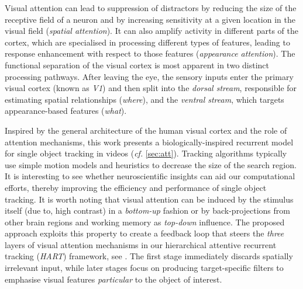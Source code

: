 	Visual attention can lead to suppression of distractors by reducing the size of the receptive field of a neuron and by increasing sensitivity at a given location in the visual field (\emph{spatial attention}). It can also amplify activity in different parts of the cortex, which are
	specialised in processing different types of features, leading to  response enhancement with respect to those features (\emph{appearance attention}).
	The functional separation of the visual cortex is most apparent in two distinct processing pathways. After leaving the eye, the sensory inputs enter the primary visual cortex (known as \emph{V1}) and then split into the \emph{dorsal stream}, responsible for estimating spatial relationships (\emph{where}), and the \emph{ventral stream}, which targets appearance-based features (\emph{what}).

    Inspired by the general architecture of the human visual cortex and the role of attention mechanisms, this work presents a biologically-inspired recurrent model for single object tracking in videos (\emph{cf.} \cref{sec:att}). Tracking algorithms typically use simple motion models and heuristics to decrease the size of the search region. It is interesting to see whether neuroscientific insights can aid our computational efforts, thereby improving the efficiency and performance of single object tracking.
	It is worth noting that visual attention can be induced by the stimulus itself (due to, \eg high contrast) in a \emph{bottom-up} fashion or by back-projections from other brain regions and working memory as \emph{top-down} influence. The proposed approach exploits this property to create a feedback loop that steers the \emph{three} layers of visual attention mechanisms in our hierarchical attentive recurrent tracking (\emph{HART}) framework, see . The first stage immediately discards spatially irrelevant input, while later stages focus on producing target-specific filters to emphasise visual features \emph{particular} to the object of interest.
	
